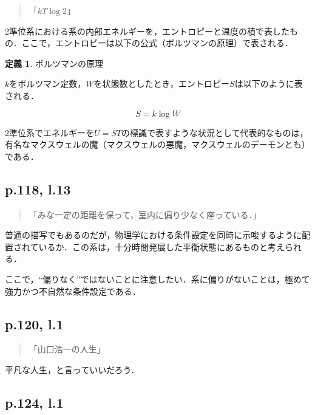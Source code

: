 \documentclass[10pt, a5paper, twoside]{jsarticle}
\theoremstyle{definition}
\newtheorem{dfn}{定義}
\begin{document}
			\begin{quote}

				「$k T \log{2}$」
				
			\end{quote}

			2準位系における系の内部エネルギーを，エントロピーと温度の積で表したもの．ここで，エントロピーは以下の公式（ボルツマンの原理）で表される．

			\begin{dfn}
				
				ボルツマンの原理

				$k$をボルツマン定数，$W$を状態数としたとき，エントロピー$S$は以下のように表される．

				$$ S = k \log{W}$$

			\end{dfn}

			2準位系でエネルギーを$U = ST$の標識で表すような状況として代表的なものは，有名なマクスウェルの魔（マクスウェルの悪魔，マクスウェルのデーモンとも）である．

		\subsection{p.118, l.13}

			\begin{quote}
				
				「みな一定の距離を保って，室内に偏り少なく座っている．」

			\end{quote}

			普通の描写でもあるのだが，物理学における条件設定を同時に示唆するように配置されているか．この系は，十分時間発展した平衡状態にあるものと考えられる．

			ここで，“偏りなく”ではないことに注意したい．系に偏りがないことは，極めて強力かつ不自然な条件設定である．

		\subsection{p.120, l.1}

			\begin{quote}
				
				「山口浩一の人生」

			\end{quote}

			平凡な人生，と言っていいだろう．

		\subsection{p.124, l.1}
\end{document}
